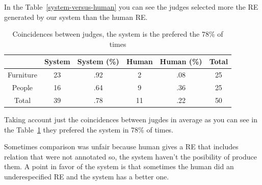 In the Table~\ref{system-versus-human} you can see the judges selected more the RE generated by our system than the human RE.



\begin{table}[h!]
\begin{center}
\begin{tabular}{|c|c|c|c|c|c|}
\hline
           & System & System (\%) & Human & Human (\%) & Total\\
\hline
Furniture & 23  & .92 &  2 & .08  & 25 \\
People    & 16  & .64 & 9  & .36 & 25 \\
\hline
Total     & 39  & .78    & 11 & .22 & 50  \\
\hline
\end{tabular}
\caption{Coincidences between judges, the system is the prefered the 78\% of times} 
\label{system-better}
\end{center}
\end{table}

Taking account just the coincidences between jugdes in average as you can see in the Table~\ref{system-better} they prefered the system in 78\% of times.

Sometimes comparison was unfair because human gives a RE that includes relation that were not annotated so, the system haven't the posibility of produce them. A point in favor of the system is that sometimes the human did an underespecified RE and the system has a better one.\\


